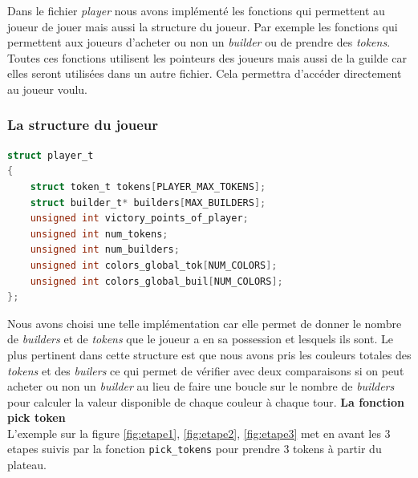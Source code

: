 \documentclass{article}
\begin{document}
\hspace{1em} Dans le fichier \emph{player} nous avons implémenté les fonctions qui permettent au joueur de jouer mais aussi la structure du joueur. Par exemple les fonctions qui permettent aux joueurs d'acheter ou non un \emph{builder} ou de prendre des \emph{tokens}. Toutes ces fonctions utilisent les pointeurs des joueurs mais aussi de la guilde car elles seront utilisées dans un autre fichier. Cela permettra d'accéder directement au joueur voulu.\\

\subsubsection{La structure du joueur}
\begin{tcolorbox}[colback=gray!10,colframe=white!75!black]
\begin{lstlisting}[language=C, caption={La structure caracterisant un joueur}, label={lst:exemple10-c}]
struct player_t 
{
    struct token_t tokens[PLAYER_MAX_TOKENS];
    struct builder_t* builders[MAX_BUILDERS];
    unsigned int victory_points_of_player;
    unsigned int num_tokens;
    unsigned int num_builders;
    unsigned int colors_global_tok[NUM_COLORS];
    unsigned int colors_global_buil[NUM_COLORS];
};
\end{lstlisting}
\end{tcolorbox}

\vspace{1em}
\hspace{1em} Nous avons choisi une telle implémentation car elle permet de donner le nombre de \emph{builders} et de \emph{tokens} que le joueur a en sa possession et lesquels ils sont. Le plus pertinent dans cette structure est que nous avons pris les couleurs totales des \emph{tokens} et des \emph{builers} ce qui permet de vérifier avec deux comparaisons si on peut acheter ou non un \emph{builder} au lieu de faire une boucle sur le nombre de \emph{builders} pour calculer la valeur disponible de chaque couleur à chaque tour. 
\vspace{1em}
\newpage
\textbf{La fonction pick token} \\
\vspace{1em }
\hspace{1em} L'exemple sur la figure \ref{fig:etape1}, \ref{fig:etape2}, \ref{fig:etape3} met en avant les 3 etapes suivis par la fonction \texttt{pick\_tokens} pour prendre 3 tokens à partir du plateau.
\end{document}
